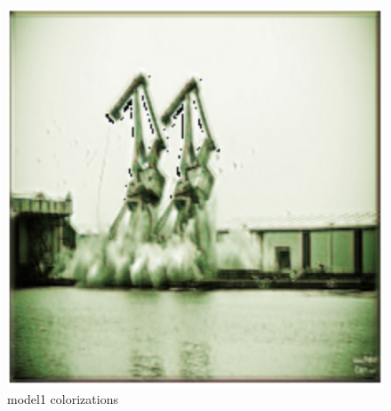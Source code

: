 \documentclass[]{article}
\begin{document}
\begin{figure}[H]
		\includegraphics[scale=0.35]{m1_3.png}
		\caption{model1 colorizations}
	\end{figure}
	
\end{document}
